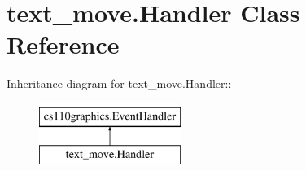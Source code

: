 \hypertarget{classtext__move_1_1Handler}{
\section{text\_\-move.Handler Class Reference}
\label{classtext__move_1_1Handler}
}
Inheritance diagram for text\_\-move.Handler::\begin{figure}[H]
\begin{center}
\leavevmode
\includegraphics[height=2cm]{classtext__move_1_1Handler}
\end{center}
\end{figure}
